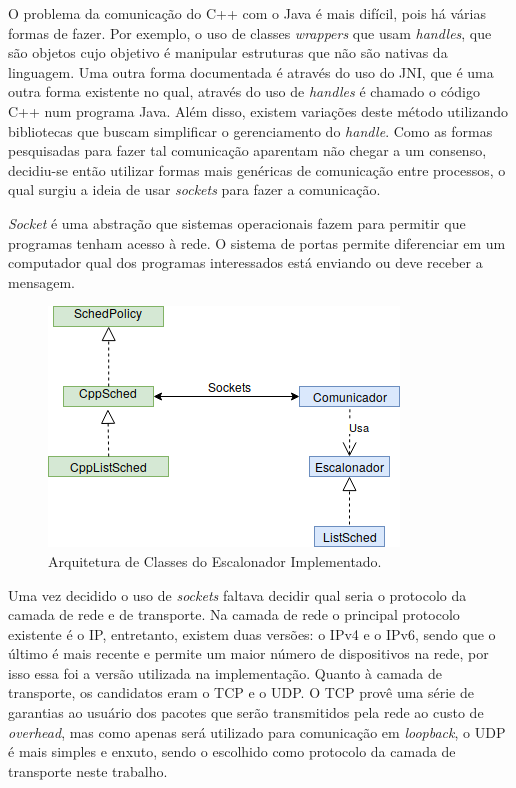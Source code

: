 O problema da comunicação do C++ com o Java é mais difícil, pois há várias formas de fazer. Por exemplo, o uso de classes \textit{wrappers} que usam \textit{handles}, que são objetos cujo objetivo é manipular estruturas que não são nativas da linguagem\cite{CppJavaHandle}. Uma outra forma documentada é através do uso do \acrfull{JNI}, que é uma outra forma existente no qual, através do uso de \textit{handles} é chamado o código C++ num programa Java\cite{CppJavaJNI}. Além disso, existem variações deste método utilizando bibliotecas que buscam simplificar o gerenciamento do \textit{handle}. Como as formas pesquisadas para fazer tal comunicação aparentam não chegar a um consenso, decidiu-se então utilizar formas mais genéricas de comunicação entre processos, o qual surgiu a ideia de usar \textit{sockets} para fazer a comunicação.

\textit{Socket} é uma abstração que sistemas operacionais fazem para permitir que programas tenham acesso à rede. O sistema de portas permite diferenciar em um computador qual dos programas interessados está enviando ou deve receber a mensagem. %

\begin{figure}[htbp]
	\centerline{\includegraphics[scale=0.7]{img/Proposta.png}}
	\caption{Arquitetura de Classes do Escalonador Implementado.}
	\label{ArquiteturaProposta}
\end{figure}

Uma vez decidido o uso de \textit{sockets} faltava decidir qual seria o protocolo da camada de rede e de transporte. Na camada de rede o principal protocolo existente é o \acrfull{IP}, entretanto, existem duas versões: o IPv4\cite{ipv4rfc} e o IPv6\cite{ipv6rfc}, sendo que o último é mais recente e permite um maior número de dispositivos na rede, por isso essa foi a versão utilizada na implementação. Quanto à camada de transporte, os candidatos eram o \acrshort{TCP}\cite{tcp_rfc} e o \acrshort{UDP}\cite{udp_rfc}. O \acrshort{TCP} provê uma série de garantias ao usuário dos pacotes que serão transmitidos pela rede ao custo de \textit{overhead}, mas como apenas será utilizado para comunicação em \textit{loopback}, o \acrshort{UDP} é mais simples e enxuto, sendo o escolhido como protocolo da camada de transporte neste trabalho.

